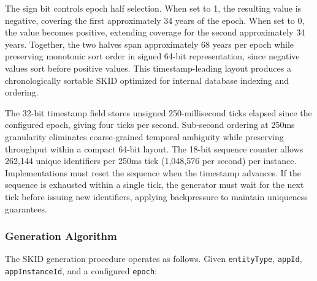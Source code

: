 \documentclass[fleqn,10pt,lineno]{wlpeerj}
\begin{document}
The sign bit controls epoch half selection. When set to 1, the resulting
value is negative, covering the first approximately 34 years of the
epoch. When set to 0, the value becomes positive, extending coverage for
the second approximately 34 years. Together, the two halves span
approximately 68 years per epoch while preserving monotonic sort order
in signed 64-bit representation, since negative values sort before
positive values. This timestamp-leading layout produces a
chronologically sortable SKID optimized for internal database indexing
and ordering.

The 32-bit timestamp field stores unsigned 250-millisecond ticks elapsed
since the configured epoch, giving four ticks per second. Sub-second
ordering at 250ms granularity eliminates coarse-grained temporal
ambiguity while preserving throughput within a compact 64-bit layout.
The 18-bit sequence counter allows 262,144 unique identifiers per 250ms
tick (1,048,576 per second) per instance. Implementations must reset the
sequence when the timestamp advances. If the sequence is exhausted
within a single tick, the generator must wait for the next tick before
issuing new identifiers, applying backpressure to maintain uniqueness
guarantees.

\subsubsection{Generation Algorithm}\label{generation-algorithm}

The SKID generation procedure operates as follows. Given
\texttt{entityType}, \texttt{appId}, \texttt{appInstanceId}, and a
configured \texttt{epoch}:
\end{document}
